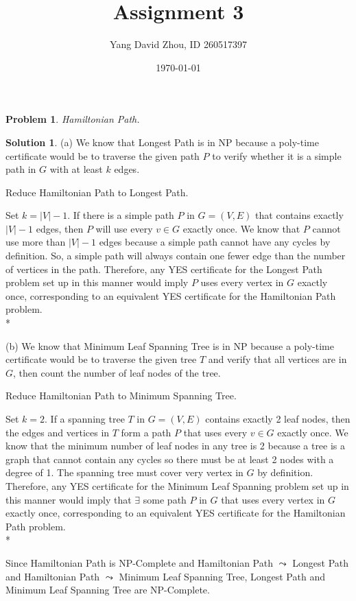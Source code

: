 \documentclass{article}
\newtheorem{problem}{Problem}
\theoremstyle{definition}
\newtheorem*{solution}{Solution}
\begin{document}
 \title{Assignment 3} 

\author{Yang David Zhou, ID 260517397} 

\date{\today}

\maketitle

\begin{problem} 

Hamiltonian Path.

\end{problem}

\begin{solution}

(a) We know that Longest Path is in NP because a poly-time certificate would be to traverse the given path \(P\) to verify whether it is a simple path in \(G\) with at least \(k\) edges.

Reduce Hamiltonian Path to Longest Path.

Set \(k=|V|-1\). If there is a simple path \(P\) in \(G=(V,E)\) that contains exactly \(|V|-1\) edges, then \(P\) will use every \(v\in G\) exactly once. We know that \(P\) cannot use more than \(|V|-1\) edges because a simple path cannot have any cycles by definition. So, a simple path will always contain one fewer edge than the number of vertices in the path. Therefore, any YES certificate for the Longest Path problem set up in this manner would imply \(P\) uses every vertex in \(G\) exactly once, corresponding to an equivalent YES certificate for the Hamiltonian Path problem. \\*

(b) We know that Minimum Leaf Spanning Tree is in NP because a poly-time certificate would be to traverse the given tree \(T\) and verify that all vertices are in \(G\), then count the number of leaf nodes of the tree.

Reduce Hamiltonian Path to Minimum Spanning Tree.

Set \(k=2\). If a spanning tree \(T\) in \(G=(V,E)\) contains exactly 2 leaf nodes, then the edges and vertices in \(T\) form a path \(P\) that uses every \(v\in G\) exactly once. We know that the minimum number of leaf nodes in any tree is 2 because a tree is a graph that cannot contain any cycles so there must be at least 2 nodes with a degree of 1. The spanning tree must cover very vertex in \(G\) by definition. Therefore, any YES certificate for the Minimum Leaf Spanning problem set up in this manner would imply that \(\exists\) some path \(P\) in \(G\) that uses every vertex in \(G\) exactly once, corresponding to an equivalent YES certificate for the Hamiltonian Path problem. \\*

Since Hamiltonian Path is NP-Complete and Hamiltonian Path \(\leadsto \) Longest Path and Hamiltonian Path \(\leadsto \) Minimum Leaf Spanning Tree, Longest Path and Minimum Leaf Spanning Tree are NP-Complete.

\end{solution}
\end{document}
